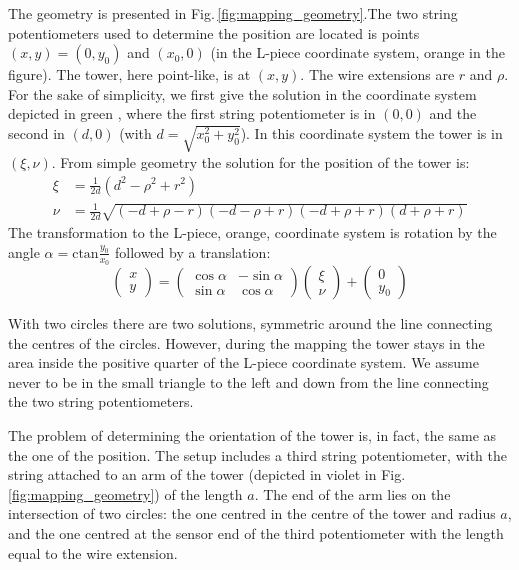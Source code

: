 The geometry is presented in Fig.\,\ref{fig:mapping_geometry}.The two string potentiometers used to determine the position are located is points $(x, y) = (0, y_0)$ and $(x_0, 0)$ (in the L-piece coordinate system, orange in the figure).
The tower, here point-like, is at $(x,y)$.
The wire extensions are $r$ and $\rho$. For the sake of simplicity, we first give the solution in the coordinate system depicted in green , where the first string potentiometer is in $(0,0)$ and the second in $(d, 0)$ (with $d = \sqrt{x_0^2 + y_0^2}$). In this coordinate system the tower is in $(\xi, \nu)$. From simple geometry the solution for the position of the tower is:
\begin{align}
  \xi & = \frac{1}{2d} \left( d^2 - \rho^2 + r^2 \right) \\
  \nu & = \frac{1}{2d} \sqrt{ (-d + \rho - r) (-d - \rho + r) (-d + \rho + r) (d + \rho + r) }
\end{align}
The transformation to the L-piece, orange, coordinate system is rotation by the angle $\alpha = \mathrm{ctan} \frac{y_0}{x_0}$ followed by a translation:
\begin{equation}
  \begin{pmatrix}
    x \\
    y
  \end{pmatrix}
  =
  \begin{pmatrix}
    \cos \alpha & -\sin \alpha \\
    \sin \alpha & \cos \alpha
  \end{pmatrix}
  \begin{pmatrix}
    \xi \\
    \nu
  \end{pmatrix}
  +
  \begin{pmatrix}
    0 \\
    y_0
  \end{pmatrix}
\end{equation}


With two circles there are two solutions, symmetric around the line connecting the centres of the circles. However, during the mapping the tower stays in the area inside the positive quarter of the L-piece coordinate system.
We assume never to be in the small triangle to the left and down from the line connecting the two string potentiometers.

The problem of determining the orientation of the tower is, in fact, the same as the one of the position. The setup includes a third string potentiometer, with the string attached to  an arm of the tower (depicted in violet in Fig.\,\ref{fig:mapping_geometry}) of the length $a$. The end of the arm lies on the intersection of two circles: the one centred in the centre of the tower and radius $a$, and the one centred at the sensor end of the third potentiometer with the length equal to the wire extension.

